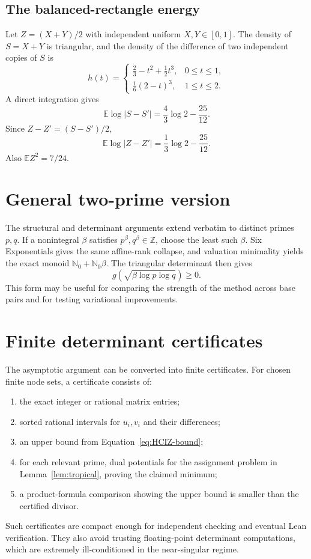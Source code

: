 \documentclass[11pt]{article}
\theoremstyle{definition}
\newcommand{\Nzero}{\mathbb N_0}
\newcommand{\Z}{\mathbb Z}
\newcommand{\E}{\mathbb E}
\begin{document}
\subsection{The balanced-rectangle energy}

Let $Z=(X+Y)/2$ with independent uniform $X,Y\in[0,1]$.  The density of
$S=X+Y$ is triangular, and the density of the difference of two independent
copies of $S$ is
\[
 h(t)=
 \begin{cases}
  \frac23-t^2+\frac12t^3,&0\le t\le1,\\
  \frac16(2-t)^3,&1\le t\le2.
 \end{cases}
\]
A direct integration gives
\[
 \E\log|S-S'|=\frac43\log2-\frac{25}{12}.
\]
Since $Z-Z'=(S-S')/2$,
\[
 \E\log|Z-Z'|=\frac13\log2-\frac{25}{12}.
\]
Also $\E Z^2=7/24$.

\section{General two-prime version}

The structural and determinant arguments extend verbatim to distinct primes
$p,q$.  If a nonintegral $\beta$ satisfies $p^\beta,q^\beta\in\Z$, choose the
least such $\beta$.  Six Exponentials gives the same affine-rank collapse, and
valuation minimality yields the exact monoid $\Nzero+\Nzero\beta$.  The
triangular determinant then gives
\[
 g\!\left(\sqrt{\beta\log p\log q}\right)\ge0.
\]
This form may be useful for comparing the strength of the method across base
pairs and for testing variational improvements.

\section{Finite determinant certificates}

The asymptotic argument can be converted into finite certificates.  For chosen
finite node sets, a certificate consists of:
\begin{enumerate}
\item the exact integer or rational matrix entries;
\item sorted rational intervals for $u_i,v_i$ and their differences;
\item an upper bound from Equation~\eqref{eq:HCIZ-bound};
\item for each relevant prime, dual potentials for the assignment problem in
      Lemma~\ref{lem:tropical}, proving the claimed minimum;
\item a product-formula comparison showing the upper bound is smaller than the
      certified divisor.
\end{enumerate}
Such certificates are compact enough for independent checking and eventual
Lean verification.  They also avoid trusting floating-point determinant
computations, which are extremely ill-conditioned in the near-singular regime.
\end{document}
